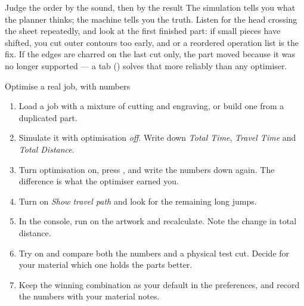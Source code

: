 \begin{machinebox}{Judge the order by the sound, then by the result}
The simulation tells you what the planner thinks; the machine tells you the truth.
Listen for the head crossing the sheet repeatedly, and look at the first finished
part: if small pieces have shifted, you cut outer contours too early, and
 or a reordered operation list is the fix. If the edges are
charred on the last cut only, the part moved because it was no longer supported
--- a tab () solves that more reliably than any optimiser.
\end{machinebox}

\begin{tryit}{Optimise a real job, with numbers}
\begin{enumerate}[label=\arabic*.,leftmargin=1.4em]
  \item Load a job with a mixture of cutting and engraving, or build one from a
        duplicated part.
  \item Simulate it with optimisation \emph{off}. Write down \emph{Total Time},
        \emph{Travel Time} and \emph{Total Distance}.
  \item Turn optimisation on, press , and write the numbers down
        again. The difference is what the optimiser earned you.
  \item Turn on \emph{Show travel path} and look for the remaining long jumps.
  \item In the console, run  on the artwork and recalculate.
        Note the change in total distance.
  \item Try  on and compare both the numbers and a physical
        test cut. Decide for your material which one holds the parts better.
  \item Keep the winning combination as your default in the preferences, and
        record the numbers with your material notes.
\end{enumerate}
\end{tryit}
